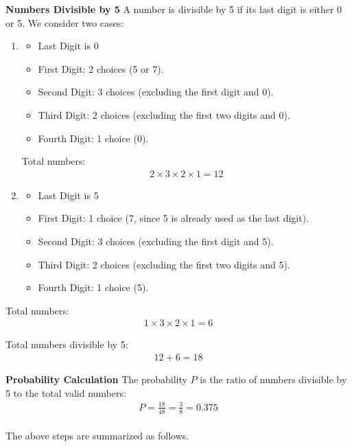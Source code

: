 \documentclass[journal]{IEEEtran}
\begin{document}
\textbf{Numbers Divisible by 5}
A number is divisible by 5 if its last digit is either 0 or 5. We consider two cases:\\
\begin{enumerate}
\item  \begin{itemize}
\item Last Digit is 0
\item First Digit: 2 choices (5 or 7).
\item Second Digit: 3 choices (excluding the first digit and 0).
\item Third Digit: 2 choices (excluding the first two digits and 0).
\item Fourth Digit: 1 choice (0).
\end{itemize}
   Total numbers:
   \begin{align}
   2 \times 3 \times 2 \times 1 = 12
   \end{align}

\item
\begin{itemize}
\item Last Digit is 5
\item First Digit: 1 choice (7, since 5 is already used as the last digit).
\item Second Digit: 3 choices (excluding the first digit and 5).
\item Third Digit: 2 choices (excluding the first two digits and 5).
\item Fourth Digit: 1 choice (5).
\end{itemize}
\end{enumerate}

   Total numbers:
   \begin{align}
   1 \times 3 \times 2 \times 1 = 6
   \end{align}

Total numbers divisible by 5:
\begin{align}
12 + 6 = 18
\end{align}

\textbf{Probability Calculation}
The probability $P$ is the ratio of numbers divisible by 5 to the total valid numbers:
\begin{align}
P = \frac{18}{48} = \frac{3}{8} = 0.375
\end{align}\\

The above steps are summarized as follows.\\
\end{document}
